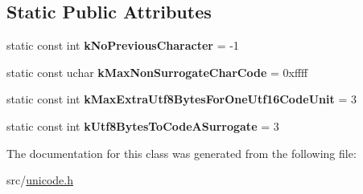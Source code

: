 \subsection*{Static Public Attributes}
\begin{DoxyCompactItemize}
\item 
\hypertarget{classunibrow_1_1_utf16_a1160051ffd27a644ec813172985b3002}{}static const int {\bfseries k\+No\+Previous\+Character} = -\/1\label{classunibrow_1_1_utf16_a1160051ffd27a644ec813172985b3002}

\item 
\hypertarget{classunibrow_1_1_utf16_a621e7db0a6d40f06c69c7041f48a5591}{}static const uchar {\bfseries k\+Max\+Non\+Surrogate\+Char\+Code} = 0xffff\label{classunibrow_1_1_utf16_a621e7db0a6d40f06c69c7041f48a5591}

\item 
\hypertarget{classunibrow_1_1_utf16_a74bc74e44596d0b574d843e6c3bf7eb8}{}static const int {\bfseries k\+Max\+Extra\+Utf8\+Bytes\+For\+One\+Utf16\+Code\+Unit} = 3\label{classunibrow_1_1_utf16_a74bc74e44596d0b574d843e6c3bf7eb8}

\item 
\hypertarget{classunibrow_1_1_utf16_aca30a98f189d6b895c08c396761c9495}{}static const int {\bfseries k\+Utf8\+Bytes\+To\+Code\+A\+Surrogate} = 3\label{classunibrow_1_1_utf16_aca30a98f189d6b895c08c396761c9495}

\end{DoxyCompactItemize}


The documentation for this class was generated from the following file\+:\begin{DoxyCompactItemize}
\item 
src/\hyperlink{unicode_8h}{unicode.\+h}\end{DoxyCompactItemize}
